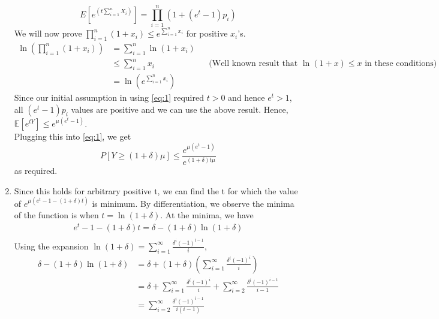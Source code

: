 \begin{enumerate}
    \[
        E[e^{\left(t \sum_{i=1}^n X_i\right)}]=\prod_{i=1}^n (1+(e^t-1)p_i)
    \]
    We will now prove $\prod_{i=1}^n (1+x_i) \le e^{\sum_{i=1}^n x_i}$ for positive $x_i$'s.
    \begin{align*}
        \ln\left(\prod_{i=1}^n (1+x_i)\right)&=\sum_{i=1}^n \ln(1+x_i)\\
        &\le \sum_{i=1}^n x_i && \text{(Well known result that $\ln(1+x)\le x$ in these conditions)}\\
        &= \ln\left(e^{\sum_{i=1}^n x_i}\right)
    \end{align*}
    Since our initial assumption in using \ref{eq:1} required $t>0$ and hence $e^t > 1$, all $(e^t-1)p_i$ values are positive and we can use the above result.
    Hence, $\mathbb{E}[e^{tY}] \le e^{\mu (e^t-1)}$.\\
    Plugging this into \ref{eq:1}, we get
    \[
        P[Y\ge (1+\delta)\mu]\le \frac{e^{\mu(e^t-1)}}{e^{(1+\delta)t\mu}}
    \]
    as required.\\
    \item Since this holds for arbitrary positive t, we can find the t for which the value of $e^{\mu (e^t-1-(1+\delta)t)}$ is minimum. By differentiation, we observe the minima of the function is when $t=\ln(1+\delta)$. At the minima, we have
    \begin{align*}
        e^t-1-(1+\delta)t = \delta-(1+\delta)\ln(1+\delta)\\
    \end{align*}
    Using the expansion $\ln(1+\delta)=\sum_{i=1}^{\infty}\frac{\delta^i(-1)^{i-1}}{i}$,
    \begin{align*}
        \delta - (1+\delta)\ln(1+\delta) &= \delta + (1+\delta)(\sum_{i=1}^{\infty}\frac{\delta^i(-1)^i}{i})\\
        &= \delta + \sum_{i=1}^{\infty}\frac{\delta^i(-1)^i}{i} + \sum_{i=2}^{\infty}\frac{\delta^{i}(-1)^{i-1}}{i-1}\\
        &= \sum_{i=2}^{\infty} \frac{\delta^i(-1)^{i-1}}{i(i-1)}\\

\end{align*}
\end{enumerate}
